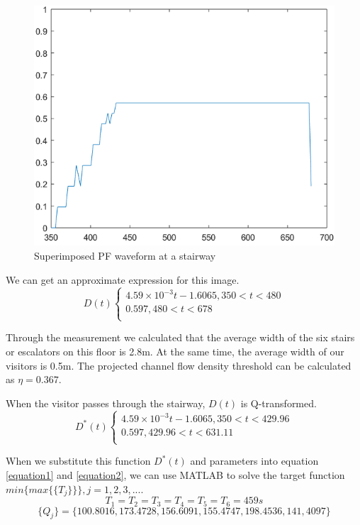 \begin{figure}[H]
    \centering
    \includegraphics[scale=0.6]{04.png}
    \caption{Superimposed PF waveform at a stairway}
    \label{1}
\end{figure}

We can get an approximate expression for this image.
    $$D(t)\left\{
    \begin{array}{lr}
    4.59\times10^{-3}t-1.6065,350<t<480\\
    0.597,480<t<678\\
    \end{array}
    \right.$$
    
Through the measurement we calculated that the average width of the six stairs or escalators on this floor is 2.8m. At the same time, the average width of our visitors is 0.5m. The projected channel flow density threshold can be calculated as $\eta=0.367$.

When the visitor passes through the stairway, $D(t)$ is Q-transformed.
    $$D^*(t)\left\{
    \begin{array}{lr}
    4.59\times10^{-3}t-1.6065,350<t<429.96\\
    0.597,429.96<t<631.11\\
    \end{array}
    \right.$$
    
When we substitute this function $D^*(t)$ and parameters into equation \ref{equation1} and \ref{equation2}, we can use MATLAB to solve the target function $min\{max\{\{T_j\}\}\}, j=1, 2, 3,...$.
\[
T_1=T_2=T_3=T_4=T_5=T_6=459s
\]
\[
\{Q_j\}=\{100.8016,173.4728,156.6091,155.4747,198.4536,141,4097\}
\]

